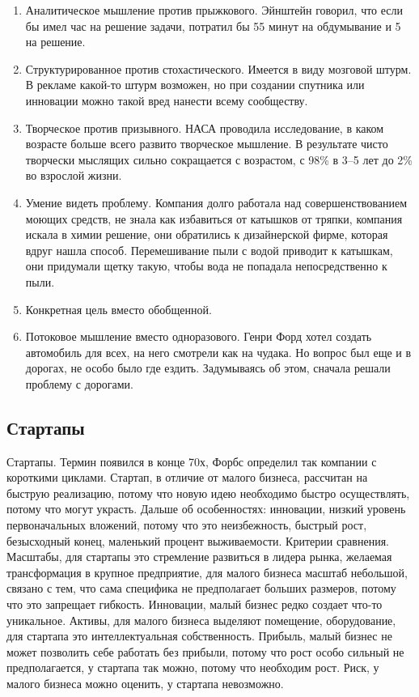 \documentclass[a4paper, 12pt]{article}
\begin{document}
\begin{enumerate}
\item Аналитическое мышление против прыжкового. Эйнштейн говорил, что если бы имел час на решение задачи, потратил бы 55 минут на обдумывание и 5 на решение. 
\item Структурированное против стохастического. Имеется в виду мозговой штурм. В рекламе какой-то штурм возможен, но при создании спутника или инновации можно такой вред нанести всему сообществу. 
\item Творческое против призывного. НАСА проводила исследование, в каком возрасте больше всего развито творческое мышление. В результате чисто творчески мыслящих сильно сокращается с возрастом, с 98\% в 3--5 лет до 2\% во взрослой жизни. 
\item Умение видеть проблему. Компания долго работала над совершенствованием моющих средств, не знала как избавиться от катышков от тряпки, компания искала в химии решение, они обратились к дизайнерской фирме, которая вдруг нашла способ. Перемешивание пыли с водой приводит к катышкам, они придумали щетку такую, чтобы вода не попадала непосредственно к пыли. 
\item Конкретная цель вместо обобщенной. 
\item Потоковое мышление вместо одноразового. Генри Форд хотел создать автомобиль для всех, на него смотрели как на чудака. Но вопрос был еще и в дорогах, не особо было где ездить. Задумываясь об этом, сначала решали проблему с дорогами. 
\end{enumerate}

\subsection{Стартапы}

Стартапы. Термин появился в конце 70х, Форбс определил так компании с короткими циклами. Стартап, в отличие от малого бизнеса, рассчитан на быструю реализацию, потому что новую идею необходимо быстро осуществлять, потому что могут украсть. Дальше об особенностях: инновации, низкий уровень первоначальных вложений, потому что это неизбежность, быстрый рост, безысходный конец, маленький процент выживаемости. Критерии сравнения. Масштабы, для стартапы это стремление развиться в лидера рынка, желаемая трансформация в крупное предприятие, для малого бизнеса масштаб небольшой, связано с тем, что сама специфика не предполагает больших размеров, потому что это запрещает гибкость. Инновации, малый бизнес редко создает что-то уникальное. Активы, для малого бизнеса выделяют помещение, оборудование, для стартапа это интеллектуальная собственность. Прибыль, малый бизнес не может позволить себе работать без прибыли, потому что рост особо сильный не предполагается, у стартапа так можно, потому что необходим рост. Риск, у малого бизнеса можно оценить, у стартапа невозможно. 
\end{document}
